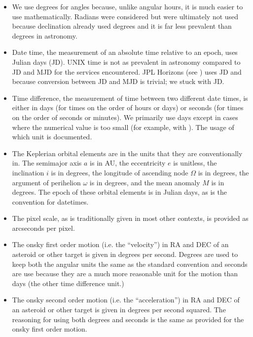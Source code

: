 \documentclass[letterpaper,11pt,english]{sphinxmanual}
\begin{document}
\begin{itemize}
\item {} 
\sphinxAtStartPar
We use degrees for angles because, unlike angular hours, it is much easier to use mathematically. Radians were considered but were ultimately not used because declination already used degrees and it is far less prevalent than degrees in astronomy.

\item {} 
\sphinxAtStartPar
Date time, the measurement of an absolute time relative to an epoch, uses Julian days (JD). UNIX time is not as prevalent in astronomy compared to JD and MJD for the services encountered. JPL Horizons (see {\hyperref[\detokenize{technical/architecture/services_engines:technical-architecture-services-engines-ephemerisengines-jpl-horizons}]{}}) uses JD and because conversion between JD and MJD is trivial; we stuck with JD.

\item {} 
\sphinxAtStartPar
Time difference, the measurement of time between two different date times, is either in days (for times on the order of hours or days) or seconds (for times on the order of seconds or minutes). We primarily use days except in cases where the numerical value is too small (for example, with {\hyperref[\detokenize{technical/algorithms/polynomial_propagation:technical-algorithms-polynomial-propagation}]{}}). The usage of which unit is documented.

\item {} 
\sphinxAtStartPar
The Keplerian orbital elements are in the units that they are conventionally in. The semi\sphinxhyphen{}major axis \(a\) is in AU, the eccentricity \(e\) is unit\sphinxhyphen{}less, the inclination \(i\) is in degrees, the longitude of ascending node \(\Omega\) is in degrees, the argument of perihelion \(\omega\) is in degrees, and the mean anomaly \(M\) is in degrees. The epoch of these orbital elements is in Julian days, as is the convention for date\sphinxhyphen{}times.

\item {} 
\sphinxAtStartPar
The pixel scale, as is traditionally given in most other contexts, is provided as arcseconds per pixel.

\item {} 
\sphinxAtStartPar
The on\sphinxhyphen{}sky first order motion (i.e. the “velocity”) in RA and DEC of an asteroid or other target is given in degrees per second. Degrees are used to keep both the angular units the same as the standard convention and seconds are use because they are a much more reasonable unit for the motion than days (the other time difference unit.)

\item {} 
\sphinxAtStartPar
The on\sphinxhyphen{}sky second order motion (i.e. the “acceleration”) in RA and DEC of an asteroid or other target is given in degrees per second squared. The reasoning for using both degrees and seconds is the same as provided for the on\sphinxhyphen{}sky first order motion.

\end{itemize}
\end{document}
